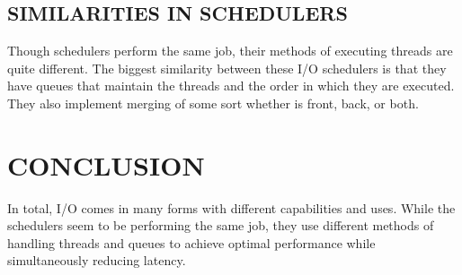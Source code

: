 \documentclass[letterpaper, 10 pt, conference]{ieeeconf}  %
\begin{document}
\subsection{SIMILARITIES IN SCHEDULERS}

Though schedulers perform the same job, their methods of executing threads are quite different. The biggest similarity between these I/O schedulers is that they have queues that maintain the threads and the order in which they are executed. They also implement merging of some sort whether is front, back, or both. 

\section{CONCLUSION}

In total, I/O comes in many forms with different capabilities and uses. While the schedulers seem to be performing the same job, they use different methods of handling threads and queues to achieve optimal performance while simultaneously reducing latency.
\addtolength{\textheight}{-12cm} 



\end{document}
